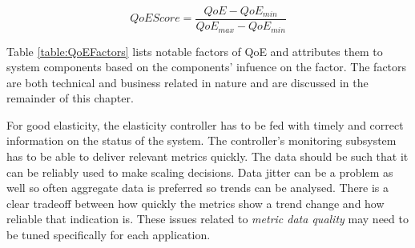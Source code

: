 \documentclass[english]{tktltiki2}
\theoremstyle{definition}
\theoremstyle{remark}
\begin{document}
\begin{equation}
	QoEScore = \frac{QoE - QoE_{min}}{QoE_{max} - QoE_{min}} 
	\label{eq:qoeScore}
\end{equation}

Table
\ref{table:QoEFactors} lists notable factors of QoE and attributes them to system
components based on the components' infuence on the factor. The factors are both
technical and business related in nature and are discussed in the remainder of
this chapter.

	\begin{table}[h]
	    \caption{QoE factors and the system components which can affect them.}
	    \label{table:QoEFactors}

	\end{table}

For good elasticity, the elasticity controller has to be fed with timely and
correct information on the status of the system. The controller's monitoring
subsystem has to be able to deliver relevant metrics quickly. The data should be
such that it can be reliably used to make scaling decisions. Data jitter can be
a problem as well so often aggregate data is preferred so trends can be
analysed. There is a clear tradeoff between how quickly the metrics show a trend
change and how reliable that indication is. These issues related to
\textit{metric data quality} may need to be tuned specifically for each
application.
\end{document}
